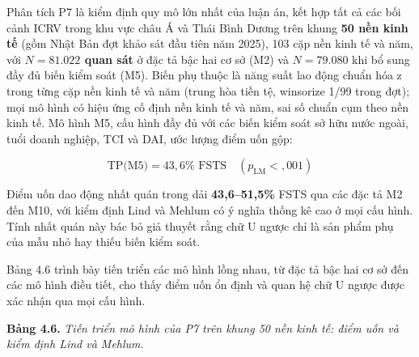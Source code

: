 \documentclass[
  a4paper,
  13pt]{extreport}
\begin{document}
Phân tích P7 là kiểm định quy mô lớn nhất của luận án, kết hợp tất cả
các bối cảnh ICRV trong khu vực châu Á và Thái Bình Dương trên khung
\textbf{50 nền kinh tế} (gồm Nhật Bản đợt khảo sát đầu tiên năm 2025),
103 cặp nền kinh tế và năm, với \textbf{\(N = 81.022\) quan sát} ở đặc
tả bậc hai cơ sở (M2) và \(N = 79.080\) khi bổ sung đầy đủ biến kiểm
soát (M5). Biến phụ thuộc là năng suất lao động chuẩn hóa z trong từng
cặp nền kinh tế và năm (trung hòa tiền tệ, winsorize 1/99 trong đợt);
mọi mô hình có hiệu ứng cố định nền kinh tế và năm, sai số chuẩn cụm
theo nền kinh tế. Mô hình M5, cấu hình đầy đủ với các biến kiểm soát sở
hữu nước ngoài, tuổi doanh nghiệp, TCI và DAI, ước lượng điểm uốn gộp:

\[\text{TP(M5)} = 43{,}6\% \text{ FSTS} \quad (p_{\text{LM}} < {,}001)\]

Điểm uốn dao động nhất quán trong dải \textbf{43,6--51,5\%} FSTS qua các
đặc tả M2 đến M10, với kiểm định Lind và Mehlum có ý nghĩa thống kê cao
ở mọi cấu hình. Tính nhất quán này bác bỏ giả thuyết rằng chữ U ngược
chỉ là sản phẩm phụ của mẫu nhỏ hay thiếu biến kiểm soát.

Bảng 4.6 trình bày tiến triển các mô hình lồng nhau, từ đặc tả bậc hai
cơ sở đến các mô hình điều tiết, cho thấy điểm uốn ổn định và quan hệ
chữ U ngược được xác nhận qua mọi cấu hình.

\textbf{Bảng 4.6.} \emph{Tiến triển mô hình của P7 trên khung 50 nền
kinh tế: điểm uốn và kiểm định Lind và Mehlum.}
\end{document}
